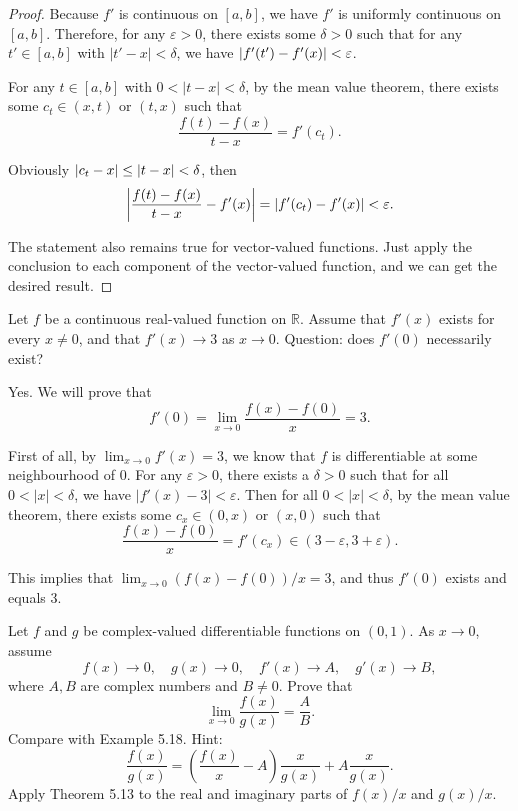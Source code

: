 \documentclass{article}
\begin{document}
\begin{proof}
  Because \( f' \) is continuous on \( [a,b] \), we have \( f' \) is uniformly continuous on \( [a,b] \). Therefore, for any \( \varepsilon > 0 \), there exists some \( \delta > 0 \) such that for any \( t' \in [a,b] \) with \( |t'-x| < \delta \), we have \( \left|f'(t')-f'(x)\right| < \varepsilon \).\par
  For any \( t \in [a,b] \) with \( 0 < |t-x| < \delta \), by the mean value theorem, there exists some \( c_t \in (x,t)\text{ or } (t,x) \) such that
  \[ \frac{f(t)-f(x)}{t-x} = f'(c_t). \]\par
  Obviously \( \left|c_t-x\right|\le\left|t-x\right|<\delta \), then
  \[ \left|\frac{f(t)-f(x)}{t-x}-f'(x)\right| = \left|f'(c_t)-f'(x)\right| < \varepsilon. \]\par
  The statement also remains true for vector-valued functions. Just apply the conclusion to each component of the vector-valued function, and we can get the desired result.
\end{proof}



\begin{problem}[5-9]
Let $f$ be a continuous real-valued function on $\mathbb{R}$.
Assume that $f'(x)$ exists for every $x\ne 0$, and that $f'(x)\to 3$ as $x\to 0$.
Question: does $f'(0)$ necessarily exist?
\end{problem}

\begin{solution}
Yes. We will prove that 
\[ f'(0)=\lim_{x\to 0}\frac{f(x)-f(0)}{x}=3. \]\par
First of all, by \( \lim_{x\to 0}f'(x)=3 \), we know that \( f \) is differentiable at some neighbourhood of 0. For any \( \varepsilon>0 \), there exists a \( \delta>0 \) such that for all \( 0<|x|<\delta \), we have \( |f'(x)-3|<\varepsilon \). Then for all \( 0<|x|<\delta \), by the mean value theorem, there exists some \( c_x \in (0,x)\text{ or } (x,0) \) such that
\[ \frac{f(x)-f(0)}{x}=f'(c_x)\in(3-\varepsilon,3+\varepsilon). \]\par
This implies that \( \lim_{x\to 0}(f(x)-f(0))/{x}=3 \), and thus \( f'(0) \) exists and equals 3.\par
\end{solution}



\begin{problem}[5-10]
Let $f$ and $g$ be complex-valued differentiable functions on $(0,1)$. As $x\to 0$, assume
\[
f(x)\to 0,\quad g(x)\to 0,\quad f'(x)\to A,\quad g'(x)\to B,
\]
where $A,B$ are complex numbers and $B\ne 0$. Prove that
\[
\lim_{x\to 0}\frac{f(x)}{g(x)}=\frac{A}{B}.
\]
Compare with Example 5.18. Hint:
\[
\frac{f(x)}{g(x)}=\left(\frac{f(x)}{x}-A\right)\frac{x}{g(x)}+A\frac{x}{g(x)}.
\]
Apply Theorem 5.13 to the real and imaginary parts of $f(x)/x$ and $g(x)/x$.
\end{problem}
\end{document}
